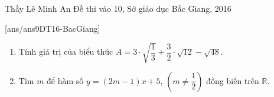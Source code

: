 \begin{name}
{Thầy  Lê Minh An}
{Đề thi vào 10, Sở giáo dục Bắc Giang, 2016}
\end{name}
\setcounter{ex}{0}
[ans/ans9DT16-BacGiang]
\begin{ex}%
\hfill
\begin{enumerate}[1.]
\item Tính giá trị của biểu thức $A=3 \cdot \sqrt{\dfrac{1}{3}} + \dfrac{3}{2} \cdot \sqrt{12} - \sqrt{48}$.
\item Tìm $m$ để hàm số $y=(2m-1)x+5$, $\left( m \neq \dfrac{1}{2}\right)$ đồng biến trên $\mathbb{R}$.
\end{enumerate}
\end{ex}

